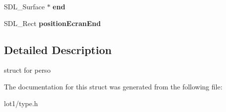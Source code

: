 \begin{DoxyCompactItemize}
\item 
S\+D\+L\+\_\+\+Surface $\ast$ {\bfseries end}\hypertarget{structPersonne_af24e28d8faaeed2bedb23f5e7b038207}{}\label{structPersonne_af24e28d8faaeed2bedb23f5e7b038207}

\item 
S\+D\+L\+\_\+\+Rect {\bfseries position\+Ecran\+End}\hypertarget{structPersonne_ab5d29c733617e93f847df8a19251262e}{}\label{structPersonne_ab5d29c733617e93f847df8a19251262e}

\end{DoxyCompactItemize}


\subsection{Detailed Description}
struct for perso 

The documentation for this struct was generated from the following file\+:\begin{DoxyCompactItemize}
\item 
lot1/type.\+h\end{DoxyCompactItemize}
